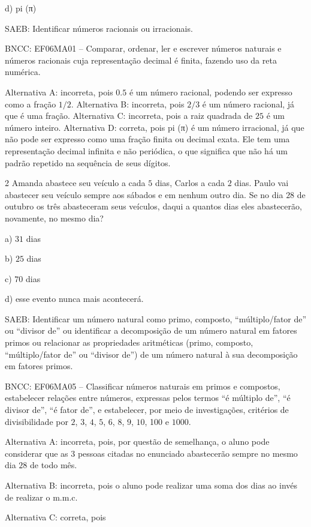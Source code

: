 d) pi (π)

SAEB: Identificar números racionais ou irracionais.

BNCC: EF06MA01 -- Comparar, ordenar, ler e escrever números naturais e
números racionais cuja representação decimal é finita, fazendo uso da
reta numérica.

Alternativa A: incorreta, pois $0.5$ é um número racional, podendo ser
expresso como a fração $1/2$. Alternativa B: incorreta, pois $2/3$ é um
número racional, já que é uma fração. Alternativa C: incorreta, pois a
raiz quadrada de $25$ é um número inteiro. Alternativa D: correta, pois pi
(π) é um número irracional, já que não pode ser expresso como uma fração
finita ou decimal exata. Ele tem uma representação decimal infinita e
não periódica, o que significa que não há um padrão repetido na
sequência de seus dígitos.

\num{2}  Amanda abastece seu veículo a cada $5$ dias, Carlos a cada $2$ dias.
Paulo vai abastecer seu veículo sempre aos sábados e em nenhum outro
dia. Se no dia $28$ de outubro os três abasteceram seus veículos, daqui a
quantos dias eles abastecerão, novamente, no mesmo dia?

a) $31$ dias

b) $25$ dias

c) $70$ dias

d) esse evento nunca mais acontecerá.

SAEB: Identificar um número natural como primo, composto,
``múltiplo/fator de'' ou ``divisor de'' ou identificar a decomposição de
um número natural em fatores primos ou relacionar as propriedades
aritméticas (primo, composto, ``múltiplo/fator de'' ou ``divisor de'')
de um número natural à sua decomposição em fatores primos.

BNCC: EF06MA05 -- Classificar números naturais em primos e compostos,
estabelecer relações entre números, expressas pelos termos ``é múltiplo
de'', ``é divisor de'', ``é fator de'', e estabelecer, por meio de
investigações, critérios de divisibilidade por $2$, $3$, $4$, $5$, $6$, $8$, $9$, $10$,
100 e $1000$.

Alternativa A: incorreta, pois, por questão de semelhança, o aluno pode
considerar que as $3$ pessoas citadas no enunciado abastecerão sempre no
mesmo dia $28$ de todo mês.

Alternativa B: incorreta, pois o aluno pode realizar uma soma dos dias
ao invés de realizar o m.m.c.

Alternativa C: correta, pois

